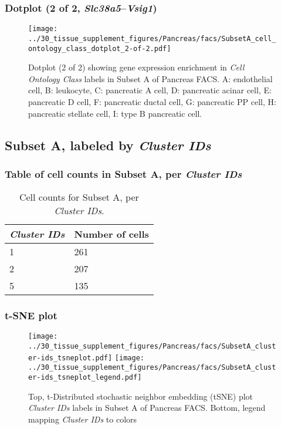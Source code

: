 \clearpage

\subsubsection{Dotplot (2 of 2, \emph{Slc38a5}--\emph{Vsig1})}
\begin{figure}[h]
\centering
\texttt{[image: ../30\_tissue\_supplement\_figures/Pancreas/facs/SubsetA\_cell\_ontology\_class\_dotplot\_2-of-2.pdf]}

\caption{ Dotplot (2 of 2)  showing gene expression enrichment in \emph{Cell Ontology Class} labels in Subset A of Pancreas FACS. A: endothelial cell, B: leukocyte, C: pancreatic A cell, D: pancreatic acinar cell, E: pancreatic D cell, F: pancreatic ductal cell, G: pancreatic PP cell, H: pancreatic stellate cell, I: type B pancreatic cell.}
\end{figure}


\clearpage

\subsection{Subset A, labeled by \emph{Cluster IDs}}
\subsubsection{Table of cell counts in Subset A, per \emph{Cluster IDs}}\begin{table}[h]
\centering
\label{my-label}
\begin{tabular}{@{}ll@{}}
\toprule

\emph{Cluster IDs}& Number of cells \\ \midrule
1 & 261 \\

2 & 207 \\

5 & 135 \\
\bottomrule
\end{tabular}
\caption{Cell counts for Subset A, per \emph{Cluster IDs}.}
\end{table}

\clearpage
\subsubsection{t-SNE plot}
\begin{figure}[h]
\centering
\texttt{[image: ../30\_tissue\_supplement\_figures/Pancreas/facs/SubsetA\_cluster-ids\_tsneplot.pdf]}
\texttt{[image: ../30\_tissue\_supplement\_figures/Pancreas/facs/SubsetA\_cluster-ids\_tsneplot\_legend.pdf]}
\caption{Top, t-Distributed stochastic neighbor embedding (tSNE) plot  \emph{Cluster IDs} labels in Subset A of Pancreas FACS. Bottom, legend mapping \emph{Cluster IDs} to colors}
\end{figure}


